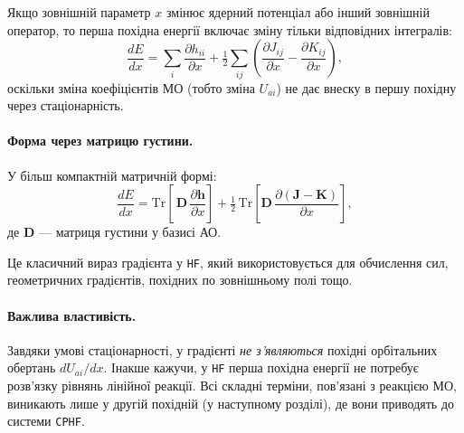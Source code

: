 Якщо зовнішній параметр $x$ змінює ядерний потенціал або інший зовнішній
оператор, то перша похідна енергії включає зміну тільки відповідних
інтегралів:
\begin{equation}\label{eq:HF_gradient_one_electron}
	\frac{dE}{dx}
	=
	\sum_i \frac{\partial h_{ii}}{\partial x}
	+
	\tfrac12 \sum_{ij}
	\left(
	\frac{\partial J_{ij}}{\partial x}
	-
	\frac{\partial K_{ij}}{\partial x}
	\right),
\end{equation}
оскільки зміна коефіцієнтів МО (тобто зміна $U_{ai}$) не дає внеску
в першу похідну через стаціонарність.

\paragraph{Форма через матрицю густини.}
У більш компактній матричній формі:
\begin{equation}\label{eq:HF_gradient_density_matrix}
	\frac{dE}{dx}
	=
	\mathrm{Tr}\!\left[\,\mathbf D\,\frac{\partial \mathbf h}{\partial x}\right]
	+
	\tfrac12\,\mathrm{Tr}\!\left[\mathbf D\,\frac{\partial (\mathbf J - \mathbf K)}{\partial x}\right],
\end{equation}
де $\mathbf D$ --- матриця густини у базисі АО.

Це класичний вираз градієнта у \texttt{HF}, який використовується для
обчислення сил, геометричних градієнтів, похідних по зовнішньому полі тощо.

\paragraph{Важлива властивість.}
Завдяки умові стаціонарності, у градієнті \emph{не з'являються} похідні
орбітальних обертань $dU_{ai}/dx$.
Інакше кажучи, у \texttt{HF} перша похідна енергії не потребує розв’язку
рівнянь лінійної реакції. Всі складні терміни, пов'язані з реакцією МО,
виникають лише у другій похідній (у наступному розділі), де вони приводять
до системи \texttt{CPHF}.


%
%

